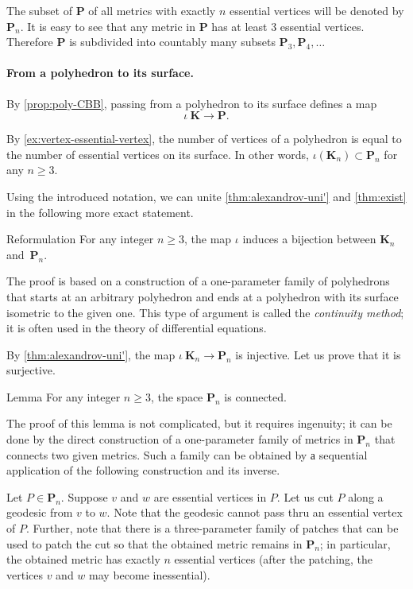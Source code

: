 The subset of $\mathbf{P}$ of all metrics with exactly $n$ essential vertices will be denoted by $\mathbf{P}_n$.
It is easy to see that any metric in $\mathbf{P}$ has at least 3 essential vertices.
Therefore $\mathbf{P}$ is subdivided into countably many subsets
 $\mathbf{P}_3,\mathbf{P}_4,\dots$

\paragraph{From a polyhedron to its surface.}

By \ref{prop:poly-CBB}, passing from a polyhedron to its surface defines a map
\[\iota\:\mathbf{K}\to \mathbf{P}.\]

By \ref{ex:vertex-essential-vertex}, the number of vertices of a polyhedron is equal to the number of essential vertices on its surface.
In other words, $\iota(\mathbf{K}_n)\subset \mathbf{P}_n$ for any $n\ge 3$.

Using the introduced notation, we can unite \ref{thm:alexandrov-uni'} and \ref{thm:exist} in the following more exact statement.

\begin{thm}{Reformulation}
For any integer $n\ge 3$,
the map $\iota$ induces a bijection between $\mathbf{K}_n$ and~$\mathbf{P}_n$.
\end{thm}

The proof is based on a construction of a one-parameter family of polyhedrons that starts at an arbitrary polyhedron
and ends at a polyhedron with its surface isometric to the given one.
This type of argument is called the \textit{continuity method}; it is often used in the theory of differential equations.


By \ref{thm:alexandrov-uni'}, the map $\iota\:\mathbf{K}_n\to\mathbf{P}_n$ is injective.
Let us prove that it is surjective.

\begin{thm}{Lemma}
For any integer $n\ge 3$, the space $\mathbf{P}_n$ is connected.
\end{thm}

The proof of this lemma is not complicated, but it requires ingenuity;
it can be done by the direct construction of a one-parameter family of metrics in $\mathbf{P}_n$ that connects two given metrics.
Such a family can be obtained by а sequential application of the following construction and its inverse.

Let $P\in\mathbf{P}_n$.
Suppose $v$ and $w$ are essential vertices in $P$.
Let us cut $P$ along a geodesic from $v$ to $w$.
Note that the geodesic cannot pass thru an essential vertex of $P$.
Further, note that there is a three-parameter family of patches that can be used to patch the cut so that the obtained metric remains in $\mathbf{P}_n$;
in particular, the obtained metric has exactly $n$ essential vertices (after the patching, the vertices $v$ and $w$ may become inessential).


